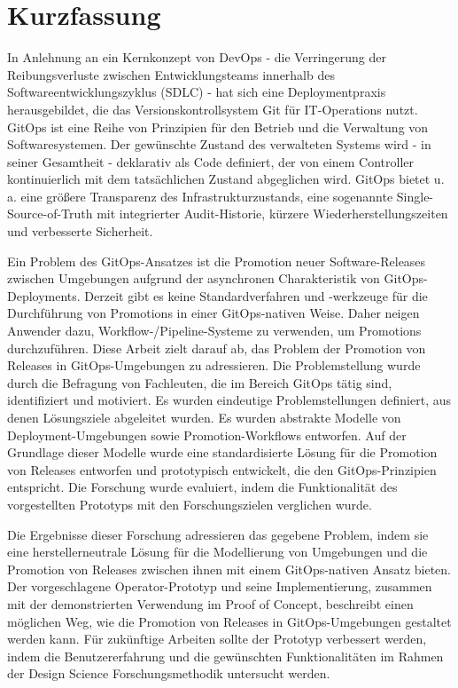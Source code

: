 \chapter{Kurzfassung}

In Anlehnung an ein Kernkonzept von DevOps - die Verringerung der Reibungsverluste zwischen Entwicklungsteams innerhalb des Softwareentwicklungszyklus (SDLC) - hat sich eine Deploymentpraxis herausgebildet, die das Versionskontrollsystem Git für IT-Operations nutzt. GitOps ist eine Reihe von Prinzipien für den Betrieb und die Verwaltung von Softwaresystemen. Der gewünschte Zustand des verwalteten Systems wird - in seiner Gesamtheit - deklarativ als Code definiert, der von einem Controller kontinuierlich mit dem tatsächlichen Zustand abgeglichen wird. GitOps bietet u. a. eine größere Transparenz des Infrastrukturzustands, eine sogenannte Single-Source-of-Truth mit integrierter Audit-Historie, kürzere Wiederherstellungszeiten und verbesserte Sicherheit.

Ein Problem des GitOps-Ansatzes ist die Promotion neuer Software-Releases zwischen Umgebungen aufgrund der asynchronen Charakteristik von GitOps-Deployments. Derzeit gibt es keine Standardverfahren und -werkzeuge für die Durchführung von Promotions in einer GitOps-nativen Weise. Daher neigen Anwender dazu, Workflow-/Pipeline-Systeme zu verwenden, um Promotions durchzuführen. Diese Arbeit zielt darauf ab, das Problem der Promotion von Releases in GitOps-Umgebungen zu adressieren. Die Problemstellung wurde durch die Befragung von Fachleuten, die im Bereich GitOps tätig sind, identifiziert und motiviert. Es wurden eindeutige Problemstellungen definiert, aus denen Lösungsziele abgeleitet wurden. Es wurden abstrakte Modelle von Deployment-Umgebungen sowie Promotion-Workflows entworfen. Auf der Grundlage dieser Modelle wurde eine standardisierte Lösung für die Promotion von Releases entworfen und prototypisch entwickelt, die den GitOps-Prinzipien entspricht. Die Forschung wurde evaluiert, indem die Funktionalität des vorgestellten Prototyps mit den Forschungszielen verglichen wurde.

Die Ergebnisse dieser Forschung adressieren das gegebene Problem, indem sie eine herstellerneutrale Lösung für die Modellierung von Umgebungen und die Promotion von Releases zwischen ihnen mit einem GitOps-nativen Ansatz bieten. Der vorgeschlagene Operator-Prototyp und seine Implementierung, zusammen mit der demonstrierten Verwendung im Proof of Concept, beschreibt einen möglichen Weg, wie die Promotion von Releases in GitOps-Umgebungen gestaltet werden kann. Für zukünftige Arbeiten sollte der Prototyp verbessert werden, indem die Benutzererfahrung und die gewünschten Funktionalitäten im Rahmen der Design Science Forschungsmethodik untersucht werden.




















